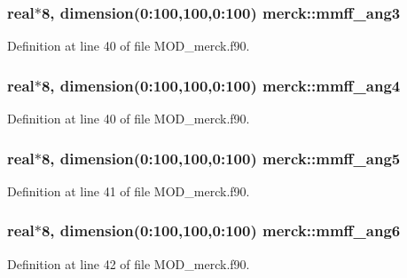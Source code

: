 \hypertarget{classmerck_a5fd32c39132b64c5d1a171dd6496bca6}{
\subsubsection[{mmff\-\_\-ang3}]{\setlength{\rightskip}{0pt plus 5cm}real$\ast$8, dimension(0\-:100,100,0\-:100) merck\-::mmff\-\_\-ang3}}\label{classmerck_a5fd32c39132b64c5d1a171dd6496bca6}


Definition at line 40 of file M\-O\-D\-\_\-merck.\-f90.

\hypertarget{classmerck_ae7864fd083808a80c93f10ff6b2ca903}{
\subsubsection[{mmff\-\_\-ang4}]{\setlength{\rightskip}{0pt plus 5cm}real$\ast$8, dimension(0\-:100,100,0\-:100) merck\-::mmff\-\_\-ang4}}\label{classmerck_ae7864fd083808a80c93f10ff6b2ca903}


Definition at line 40 of file M\-O\-D\-\_\-merck.\-f90.

\hypertarget{classmerck_a4ec8957742f39e580dede849a1cded9d}{
\subsubsection[{mmff\-\_\-ang5}]{\setlength{\rightskip}{0pt plus 5cm}real$\ast$8, dimension(0\-:100,100,0\-:100) merck\-::mmff\-\_\-ang5}}\label{classmerck_a4ec8957742f39e580dede849a1cded9d}


Definition at line 41 of file M\-O\-D\-\_\-merck.\-f90.

\hypertarget{classmerck_abe0cc32fc24620297c23877495b7c851}{
\subsubsection[{mmff\-\_\-ang6}]{\setlength{\rightskip}{0pt plus 5cm}real$\ast$8, dimension(0\-:100,100,0\-:100) merck\-::mmff\-\_\-ang6}}\label{classmerck_abe0cc32fc24620297c23877495b7c851}


Definition at line 42 of file M\-O\-D\-\_\-merck.\-f90.


